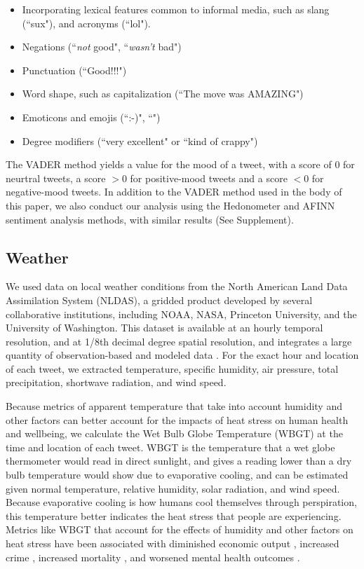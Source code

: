 \documentclass{article}
\begin{document}
\begin{itemize}
  \item Incorporating lexical features common to informal media, such as slang (``sux"), and acronyms (``lol").
  \item Negations (``\textit{not} good", ``\textit{wasn't} bad")
  \item Punctuation (``Good!!!")
  \item Word shape, such as capitalization (``The move was AMAZING")
  \item Emoticons and emojis (``:-)", ``\emojismile")
  \item Degree modifiers (``very excellent" or ``kind of crappy")
\end{itemize} 

The VADER method yields a value for the mood of a tweet, with a score of 0 for neurtral tweets, a score $> 0$ for positive-mood tweets and a score $< 0$ for negative-mood tweets.  In addition to the VADER method used in the body of this paper, we also conduct our analysis using the Hedonometer and AFINN sentiment analysis methods, with similar results (See Supplement).

\subsection{Weather}
We used data on local weather conditions from the North American Land Data Assimilation System (NLDAS), a gridded product developed by several collaborative institutions, including NOAA, NASA, Princeton University, and the University of Washington.  This dataset is available at an hourly temporal resolution, and at 1/8th decimal degree spatial resolution, and integrates a large quantity of observation-based and modeled data  \cite{xia_continental-scale_2012}.  For the exact hour and location of each tweet, we extracted temperature, specific humidity, air pressure, total precipitation, shortwave radiation, and wind speed.  

Because metrics of apparent temperature that take into account humidity and other factors can better account for the impacts of heat stress on human health and wellbeing, we calculate the Wet Bulb Globe Temperature (WBGT) at the time and location of each tweet.  WBGT is the temperature that a wet globe thermometer would read in direct sunlight, and gives a reading lower than a dry bulb temperature would show due to evaporative cooling, and can be estimated given normal temperature, relative humidity, solar radiation, and wind speed.  Because evaporative cooling is how humans cool themselves through perspiration, this temperature better indicates the heat stress that people are experiencing.  Metrics like WBGT that account for the effects of humidity and other factors on heat stress have been associated with diminished economic output \cite{rao2020projections}, increased crime \cite{hu2017impact}, increased mortality \cite{chien2016spatiotemporal, armstrong2019role}, and worsened mental health outcomes \cite{vida2012relationship, ding2016importance}.
\end{document}
